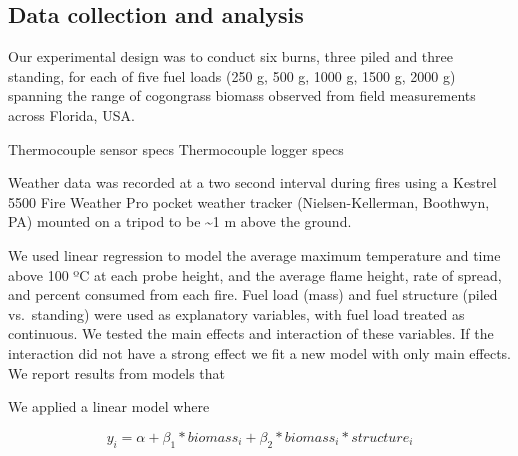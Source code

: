 \documentclass[11pt,a4paper]{article}
\begin{document}
\hypertarget{data-collection-and-analysis}{%
\subsection{Data collection and
analysis}\label{data-collection-and-analysis}}

Our experimental design was to conduct six burns, three piled and three
standing, for each of five fuel loads (250 g, 500 g, 1000 g, 1500 g,
2000 g) spanning the range of cogongrass biomass observed from field
measurements across Florida, USA.

Thermocouple sensor specs Thermocouple logger specs

Weather data was recorded at a two second interval during fires using a
Kestrel 5500 Fire Weather Pro pocket weather tracker (Nielsen-Kellerman,
Boothwyn, PA) mounted on a tripod to be \textasciitilde{}1 m above the
ground.

We used linear regression to model the average maximum temperature and
time above 100 ºC at each probe height, and the average flame height,
rate of spread, and percent consumed from each fire. Fuel load (mass)
and fuel structure (piled vs.~standing) were used as explanatory
variables, with fuel load treated as continuous. We tested the main
effects and interaction of these variables. If the interaction did not
have a strong effect we fit a new model with only main effects. We
report results from models that

We applied a linear model where

\[
y_{i} = \alpha + \beta_{1}*biomass_{i} + \beta_{2}*biomass_{i}*structure_{i} 
\]
\end{document}
